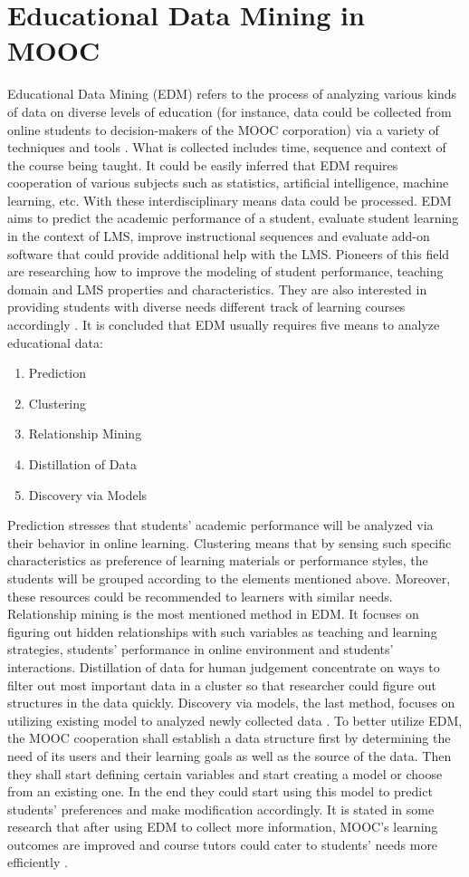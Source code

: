 \documentclass[sigconf]{acmart}
\begin{document}
\section{Educational Data Mining in MOOC}
Educational Data Mining (EDM) refers to the process of analyzing various kinds of data on diverse levels of education (for instance, data could be collected from online students to decision-makers of the MOOC corporation) via a variety of techniques and tools \cite{Berland2014}. What is collected includes time, sequence and context of the course being taught. It could be easily inferred that EDM requires cooperation of various subjects such as statistics, artificial intelligence, machine learning, etc. With these interdisciplinary means data could be processed. 
EDM aims to predict the academic performance of a student, evaluate student learning in the context of LMS, improve instructional sequences and evaluate add-on software that could provide additional help with the LMS. Pioneers of this field are researching how to improve the modeling of student performance, teaching domain and LMS properties and characteristics.  They are also interested in providing students with diverse needs different track of learning courses accordingly \cite{Baker2009}.
It is concluded that EDM usually requires five means to analyze educational data:
\begin{enumerate}
   \item Prediction
   \item Clustering
   \item Relationship Mining
   \item Distillation of Data
   \item Discovery via Models
\end{enumerate}
Prediction stresses that students' academic performance will be analyzed via their behavior in online learning. Clustering means that by sensing such specific characteristics as preference of learning materials or performance styles, the students will be grouped according to the elements mentioned above. Moreover, these resources could be recommended to learners with similar needs. Relationship mining is the most mentioned method in EDM. It focuses on figuring out hidden relationships with such variables as teaching and learning strategies, students' performance in online environment and students' interactions. Distillation of data for human judgement concentrate on ways to filter out most important data in a cluster so that researcher could figure out structures in the data quickly. Discovery via models, the last method, focuses on utilizing existing model to analyzed newly collected data \cite{Baker2009}.
To better utilize EDM, the MOOC cooperation shall establish a data structure first by determining the need of its users and their learning goals as well as the source of the data. Then they shall start defining certain variables and start creating a model or choose from an existing one. In the end they could start using this model to predict students' preferences and make modification accordingly. It is stated in some research that after using EDM to collect more information, MOOC's learning outcomes are improved and course tutors could cater to students' needs more efficiently \cite{Berland2014}.
\end{document}
